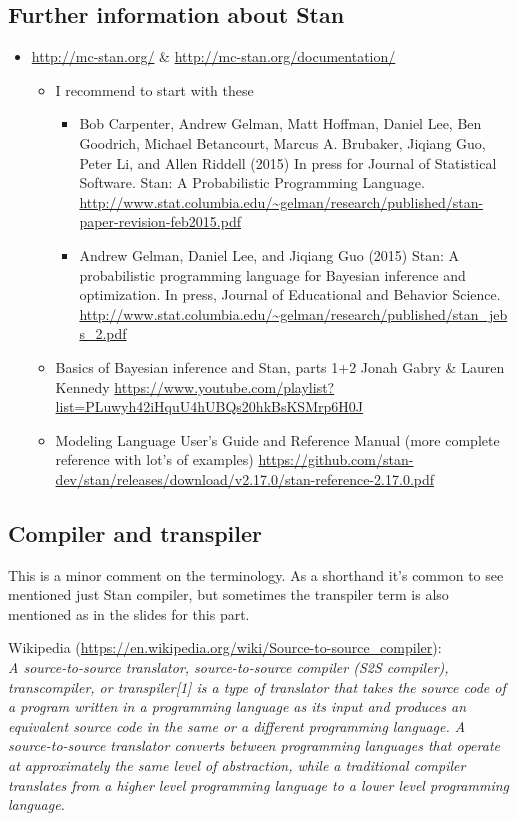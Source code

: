 \documentclass[a4paper,11pt,english]{article}
\begin{document}
\subsection*{Further information about Stan}

\begin{itemize}
\item \url{http://mc-stan.org/} \& \url{http://mc-stan.org/documentation/}
  \begin{itemize}
  \item I recommend to start with these
    \begin{itemize}
    \item Bob Carpenter, Andrew Gelman, Matt Hoffman, Daniel Lee, Ben
      Goodrich, Michael Betancourt, Marcus A. Brubaker, Jiqiang Guo,
      Peter Li, and Allen Riddell (2015) In press for Journal of
      Statistical Software. Stan: A Probabilistic Programming
      Language. \url{http://www.stat.columbia.edu/~gelman/research/published/stan-paper-revision-feb2015.pdf}
    \item Andrew Gelman, Daniel Lee, and Jiqiang Guo (2015) Stan: A
      probabilistic programming language for Bayesian inference and
      optimization. In press, Journal of Educational and Behavior
      Science. \url{http://www.stat.columbia.edu/~gelman/research/published/stan_jebs_2.pdf}
    \end{itemize}
  \item Basics of Bayesian inference and Stan, parts 1+2 Jonah Gabry \& Lauren Kennedy \url{https://www.youtube.com/playlist?list=PLuwyh42iHquU4hUBQs20hkBsKSMrp6H0J}
  \item Modeling Language User's Guide and Reference Manual (more complete reference with lot's of examples) \url{https://github.com/stan-dev/stan/releases/download/v2.17.0/stan-reference-2.17.0.pdf}
  \end{itemize}
\end{itemize}

\subsection*{Compiler and transpiler}

This is a minor comment on the terminology. As a shorthand it's common to see mentioned just Stan compiler, but sometimes the transpiler term is also mentioned as in the slides for this part.

Wikipedia (\url{https://en.wikipedia.org/wiki/Source-to-source_compiler}):\\
\textit{A source-to-source translator, source-to-source compiler (S2S compiler), transcompiler, or transpiler[1] is a type of translator that takes the source code of a program written in a programming language as its input and produces an equivalent source code in the same or a different programming language. A source-to-source translator converts between programming languages that operate at approximately the same level of abstraction, while a traditional compiler translates from a higher level programming language to a lower level programming language.}
\end{document}
